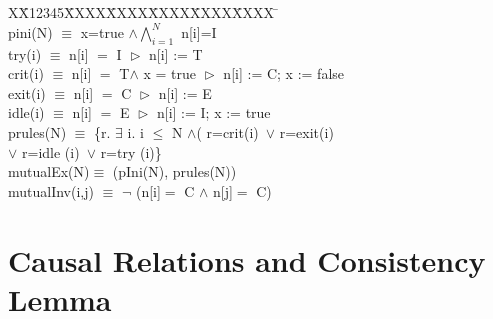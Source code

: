 \documentclass[final]{IEEEtran}
\newlength{\fminilength}
\newenvironment{fmini}[1][\linewidth]
  {\setlength{\fminilength}{#1\fboxsep-2\fboxrule}%
   \vspace{2ex}\noindent\begin{lrbox}{\fminibox}\begin{minipage}{\fminilength}%
   \mbox{ }\hfill\vspace{-2.5ex}}%
  {\end{minipage}\end{lrbox}\vspace{1ex}\hspace{0ex}%
   \framebox{\usebox{\fminibox}}}
\newenvironment{specification}
{\noindent\scriptsize
\tt\begin{fmini}\begin{tabbing}X\=X12345\=XXXX\=XXXX\=XXXX\=XXXX\=XXXX
\=\+\kill} {\end{tabbing}\normalfont\end{fmini}}
\def \eqc {=}
\def \andc {\wedge }
\def \negc {\lnot}
\newcommand{\forget}[1]{}
\begin{document}
{\begin{example}
\begin{specification}
\\
 pini(N) $\equiv$
   x=true $\wedge  \bigwedge^N_{i=1}$ n[i]=I \\

    try(i) $\equiv$ n[i] $\eqc$ I $\vartriangleright$ n[i] := T \\

    crit(i) $\equiv$ n[i] $\eqc$ T$\wedge$ x = true $\vartriangleright$  n[i] := C; x := false\\

%
   exit(i) $\equiv$ n[i] $\eqc$ C $\vartriangleright$ n[i] := E \\


   idle(i) $\equiv$  n[i] $\eqc$ E $\vartriangleright$ n[i] := I;  x := true
  \\%
   prules(N) $\equiv$ \{r. $\exists$ i. i $\le$ N $\wedge$( r=crit(i)~$\vee$ r=exit(i) \\
    $\vee$ r=idle (i)~$\vee$ r=try (i)\}\\

mutualEx(N)$\equiv$ (pIni(N), prules(N))\\

mutualInv(i,j) $\equiv$
  $\negc$ (n[i]$\eqc$ C $\andc$ n[j]$\eqc$ C)\\



\end{specification}
\end{example}


\forget{As Hoare logics specifies,  after executing statement $\alpha$, $f$ holds iff $\mathsf{preCond}(f, \alpha)$ holds before the execution.
\begin{lemma}\label{lemma-preCond}
Suppose $s\overset{\r}{\rightarrow } s'$,
$s\models \mathsf{preCond} (f, \mathsf{act}(r))$ if and only if $s'\models f$
\end{lemma}
}


\section{Causal Relations and Consistency Lemma} \label{sec:causal_rel}

}
\end{document}
